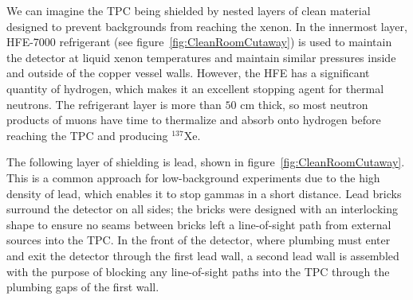We can imagine the TPC being shielded by nested layers of clean material designed to prevent backgrounds from reaching the xenon.  In the innermost layer, HFE-7000 refrigerant (see figure~\ref{fig:CleanRoomCutaway}) is used to maintain the detector at liquid xenon temperatures and maintain similar pressures inside and outside of the copper vessel walls.  However, the HFE has a significant quantity of hydrogen, which makes it an excellent stopping agent for thermal neutrons.  The refrigerant layer is more than $50$ cm thick, so most neutron products of muons have time to thermalize and absorb onto hydrogen before reaching the TPC and producing $^{137}$Xe.~\cite{detectorPartI}

The following layer of shielding is lead, shown in figure~\ref{fig:CleanRoomCutaway}.  This is a common approach for low-background experiments due to the high density of lead, which enables it to stop gammas in a short distance.  Lead bricks surround the detector on all sides; the bricks were designed with an interlocking shape to ensure no seams between bricks left a line-of-sight path from external sources into the TPC.  In the front of the detector, where plumbing must enter and exit the detector through the first lead wall, a second lead wall is assembled with the purpose of blocking any line-of-sight paths into the TPC through the plumbing gaps of the first wall.~\cite{detectorPartI}


